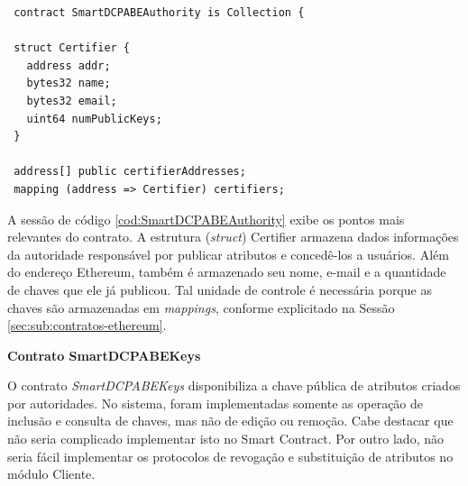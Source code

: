 \documentclass[a4paper,11pt]{article}
\begin{document}
\begin{lstlisting}
 contract SmartDCPABEAuthority is Collection {

 struct Certifier {
   address addr;
   bytes32 name;
   bytes32 email;
   uint64 numPublicKeys;
 }

 address[] public certifierAddresses;
 mapping (address => Certifier) certifiers;
\end{lstlisting} %


A sessão de código \ref{cod:SmartDCPABEAuthority} exibe os pontos mais relevantes do contrato.
A estrutura (\textit{struct}) Certifier armazena dados informações da autoridade responsável por publicar atributos e concedê-los a usuários.
Além do endereço Ethereum, também é armazenado seu nome, e-mail e a quantidade de chaves que ele já publicou.
Tal unidade de controle é necessária porque as chaves são armazenadas em \emph{mappings}, conforme explicitado na Sessão \ref{sec:sub:contratos-ethereum}.

\textbf{Contrato SmartDCPABEKeys}



O contrato \emph{SmartDCPABEKeys} disponibiliza a chave pública de atributos criados por autoridades.
No sistema, foram implementadas somente as operação de inclusão e consulta de chaves, mas não de edição ou remoção.
Cabe destacar que não seria complicado implementar isto no Smart Contract.
Por outro lado, não seria fácil implementar os protocolos de revogação e substituição de atributos no módulo Cliente.%

\end{document}

